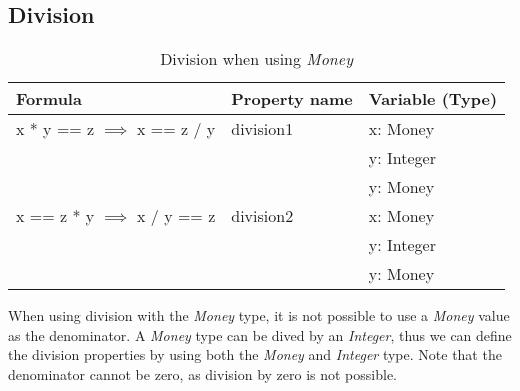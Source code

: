 \subsection*{Division}
\label{ssct:properties_division}
\FloatBarrier
\begin{table}[!ht]
\centering
\begin{tabular}{lll}
\hline
                        \textbf{Formula}                 & \textbf{Property name} & \textbf{Variable (Type)} \\ \hline
\rowcolor[HTML]{EFEFEF} x * y == z $\implies$ x == z / y & division1              & x: Money                 \\
\rowcolor[HTML]{EFEFEF}                                  &                        & y: Integer               \\
\rowcolor[HTML]{EFEFEF}                                  &                        & y: Money                 \\
                        x == z * y $\implies$ x / y == z & division2              & x: Money                 \\
                                                         &                        & y: Integer               \\
                                                         &                        & y: Money                 \\ \hline
\end{tabular}
\caption{Division when using \textit{Money}}
\label{tbl:ch4_money_division}
\end{table}
\FloatBarrier
When using division with the \textit{Money} type, it is not possible to use a
\textit{Money} value as the denominator. A \textit{Money} type can be dived by
an \textit{Integer}, thus we can define the division properties by using both
the \textit{Money} and \textit{Integer} type. Note that the denominator cannot
be zero, as division by zero is not possible. %

